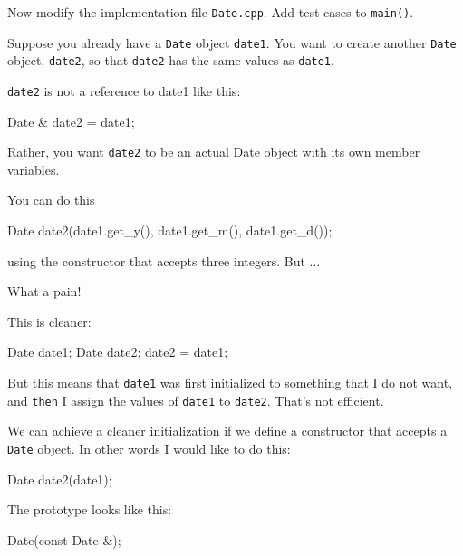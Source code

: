 Now modify the implementation file \texttt{Date.cpp}. Add test cases to
\texttt{main()}.




\newpage{}

Suppose you already have a \texttt{Date} object \texttt{date1}. You want to
create another \texttt{Date} object, \texttt{date2}, so that \texttt{date2}
has the same values as \texttt{date1}.

\texttt{date2} is not a reference to date1 like this:

\begin{consolethree}[escapeinside=||]
Date & date2 = date1;
\end{consolethree}

Rather, you want \texttt{date2} to be an actual Date object with
its own member variables.

You can do this

\begin{consolethree}[escapeinside=||]
Date date2(date1.get_y(), date1.get_m(), date1.get_d());
\end{consolethree}

using the constructor that accepts three integers. But ...

What a pain!

This is cleaner:

\begin{consolethree}[escapeinside=||]
Date date1;
Date date2;
date2 = date1;
\end{consolethree}

But this means that \texttt{date1} was first initialized to something that
I do not want, and \texttt{then} I assign the values of \texttt{date1} to
\texttt{date2}. That's not efficient.

We can achieve a cleaner initialization if we define a constructor that
accepts a \texttt{Date} object. In other words I would like to do this:

\begin{consolethree}[escapeinside=||]
Date date2(date1);
\end{consolethree}

The prototype looks like this:

\begin{consolethree}[escapeinside=||]
Date(const Date &);
\end{consolethree}

